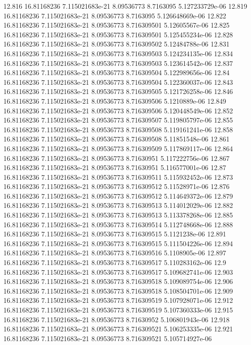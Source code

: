 {12.816 16.81168236 7.115021683e-21 8.09536773 8.7163095 5.127233729e-06
12.819 16.81168236 7.115021683e-21 8.09536773 8.7163095 5.126648669e-06
12.822 16.81168236 7.115021683e-21 8.09536773 8.716309501 5.12605567e-06
12.825 16.81168236 7.115021683e-21 8.09536773 8.716309501 5.125455234e-06
12.828 16.81168236 7.115021683e-21 8.09536773 8.716309502 5.12484788e-06
12.831 16.81168236 7.115021683e-21 8.09536773 8.716309503 5.124234135e-06
12.834 16.81168236 7.115021683e-21 8.09536773 8.716309503 5.123614542e-06
12.837 16.81168236 7.115021683e-21 8.09536773 8.716309504 5.122989656e-06
12.84 16.81168236 7.115021683e-21 8.09536773 8.716309504 5.122360037e-06
12.843 16.81168236 7.115021683e-21 8.09536773 8.716309505 5.121726258e-06
12.846 16.81168236 7.115021683e-21 8.09536773 8.716309506 5.1210889e-06
12.849 16.81168236 7.115021683e-21 8.09536773 8.716309506 5.120448549e-06
12.852 16.81168236 7.115021683e-21 8.09536773 8.716309507 5.119805797e-06
12.855 16.81168236 7.115021683e-21 8.09536773 8.716309508 5.119161241e-06
12.858 16.81168236 7.115021683e-21 8.09536773 8.716309508 5.11851548e-06
12.861 16.81168236 7.115021683e-21 8.09536773 8.716309509 5.117869117e-06
12.864 16.81168236 7.115021683e-21 8.09536773 8.71630951 5.117222756e-06
12.867 16.81168236 7.115021683e-21 8.09536773 8.71630951 5.116577001e-06
12.87 16.81168236 7.115021683e-21 8.09536773 8.716309511 5.115932452e-06
12.873 16.81168236 7.115021683e-21 8.09536773 8.716309512 5.11528971e-06
12.876 16.81168236 7.115021683e-21 8.09536773 8.716309512 5.114649372e-06
12.879 16.81168236 7.115021683e-21 8.09536773 8.716309513 5.114012029e-06
12.882 16.81168236 7.115021683e-21 8.09536773 8.716309513 5.113378268e-06
12.885 16.81168236 7.115021683e-21 8.09536773 8.716309514 5.112748668e-06
12.888 16.81168236 7.115021683e-21 8.09536773 8.716309515 5.1121238e-06
12.891 16.81168236 7.115021683e-21 8.09536773 8.716309515 5.111504226e-06
12.894 16.81168236 7.115021683e-21 8.09536773 8.716309516 5.1108905e-06
12.897 16.81168236 7.115021683e-21 8.09536773 8.716309517 5.110283162e-06
12.9 16.81168236 7.115021683e-21 8.09536773 8.716309517 5.109682741e-06
12.903 16.81168236 7.115021683e-21 8.09536773 8.716309518 5.109089754e-06
12.906 16.81168236 7.115021683e-21 8.09536773 8.716309518 5.108504701e-06
12.909 16.81168236 7.115021683e-21 8.09536773 8.716309519 5.107928071e-06
12.912 16.81168236 7.115021683e-21 8.09536773 8.716309519 5.107360333e-06
12.915 16.81168236 7.115021683e-21 8.09536773 8.71630952 5.106801943e-06
12.918 16.81168236 7.115021683e-21 8.09536773 8.716309521 5.106253335e-06
12.921 16.81168236 7.115021683e-21 8.09536773 8.716309521 5.105714927e-06
}
